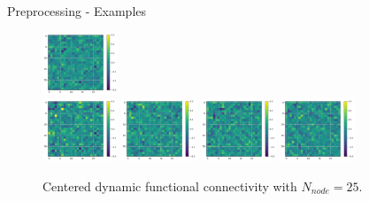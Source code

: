 \documentclass{beamer}
\begin{document}
\begin{frame}{Preprocessing - Examples}
\begin{figure}[H]
        \includegraphics[width=0.2\textwidth]{../Analysis/DFC/size=480_step=180_rho=0.1/node=25_id=100206/c_14.jpg} \\
        \includegraphics[width=0.2\textwidth]{../Analysis/DFC/size=480_step=180_rho=0.1/node=25_id=100206/c_16.jpg}
        \includegraphics[width=0.2\textwidth]{../Analysis/DFC/size=480_step=180_rho=0.1/node=25_id=100206/c_18.jpg}
        \includegraphics[width=0.2\textwidth]{../Analysis/DFC/size=480_step=180_rho=0.1/node=25_id=100206/c_20.jpg}
        \includegraphics[width=0.2\textwidth]{../Analysis/DFC/size=480_step=180_rho=0.1/node=25_id=100206/c_22.jpg} \\
        \caption{Centered dynamic functional connectivity with $N_{node} = 25$.}
    \end{figure}

\end{frame}
\end{document}

